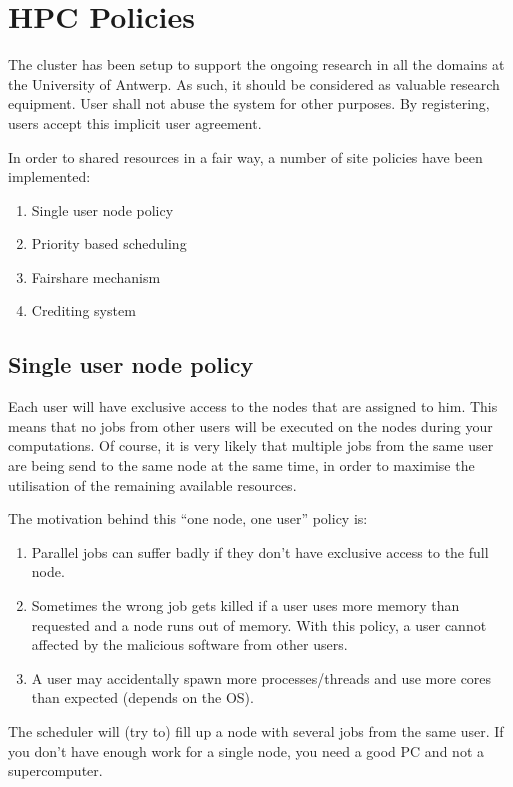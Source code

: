 \chapter{HPC Policies}
\label{ch:hpc-policies}

The cluster has been setup to support the ongoing research in all the domains
at the University of Antwerp.  As such, it should be considered as valuable
research equipment.  User shall not abuse the system for other purposes. By
registering, users accept this implicit user agreement.

In order to shared resources in a fair way, a number of site policies have been
implemented:

\begin{enumerate}
\item  Single user node policy
\item  Priority based scheduling
\item  Fairshare mechanism
\item  Crediting system
\end{enumerate}


\section{Single user node policy}

Each user will have exclusive access to the nodes that are assigned to him.
This means that no jobs from other users will be executed on the nodes during
your computations.  Of course, it is very likely that multiple jobs from the
same user are being send to the same node at the same time, in order to
maximise the utilisation of the remaining available resources.

The motivation behind this ``one node, one user'' policy is:

\begin{enumerate}
\item  Parallel jobs can suffer badly if they don't have exclusive access to the full node.
\item  Sometimes the wrong job gets killed if a user uses more memory than requested and a node runs out of memory.  With this policy, a user cannot affected by the malicious software from other users.
\item  A user may accidentally spawn more processes/threads and use more cores than expected (depends on the OS).
\end{enumerate}

The scheduler will (try to) fill up a node with several jobs from the same
user. If you don't have enough work for a single node, you need a good PC and
not a supercomputer.


